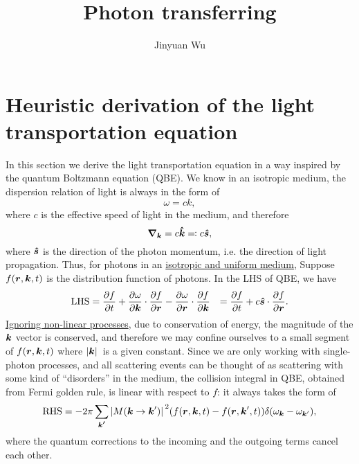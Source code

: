 \documentclass[hyperref, a4paper]{article}
\title{Photon transferring}
\author{Jinyuan Wu}
\def\\{}%
\begin{document}
\maketitle

\section{Heuristic derivation of the light transportation equation}

In this section we derive the light transportation equation 
in a way inspired by the quantum Boltzmann equation (QBE).
We know in an isotropic medium, the dispersion relation of light is always 
in the form of 
\begin{equation}
    \omega = c k,  
\end{equation}
where $c$ is the effective speed of light in the medium, 
and therefore 
\begin{equation}
    \grad_{\vb*{k}} = c \vu*{k} \eqqcolon c \vu*{s},
\end{equation}
where $\vu*{s}$ is the direction of the photon momentum, 
i.e. the direction of light propagation.
Thus, for photons in an \ul{isotropic and uniform medium}, 
Suppose $f(\vb*{r}, \vb*{k}, t)$ is the distribution function of photons.
In the LHS of QBE, we have 
\begin{equation}
    \begin{aligned}
        \text{LHS} &= \pdv{f}{t} + \pdv{\omega}{\vb*{k}} \cdot \pdv{f}{\vb*{r}}
        - \pdv{\omega}{\vb*{r}} \cdot \pdv{f}{\vb*{k}} \\
        &= \pdv{f}{t} + c \vu*{s} \cdot \pdv{f}{\vb*{r}}.
    \end{aligned}
\end{equation}
\ul{Ignoring non-linear processes}, due to conservation of energy, 
the magnitude of the $\vb*{k}$ vector is conserved, 
and therefore we may confine ourselves to 
a small segment of $f(\vb*{r}, \vb*{k}, t)$
where $\abs*{\vb*{k}}$ is a given constant.
Since we are only working with single-photon processes, 
and all scattering events can be thought of as 
scattering with some kind of ``disorders'' in the medium, 
the collision integral in QBE, obtained from Fermi golden rule, 
is linear with respect to $f$: 
it always takes the form of 
\begin{equation}
    \text{RHS} = - 2\pi \sum_{\vb*{k'}} \abs*{M(\vb*{k} \to \vb*{k}')}^2 (f(\vb*{r}, \vb*{k} , t) - f(\vb*{r}, \vb*{k}', t) )
    \delta(\omega_{\vb*{k}} - \omega_{\vb*{k}'}),
\end{equation}
where the quantum corrections to the incoming and the outgoing terms 
cancel each other. 
\end{document}
